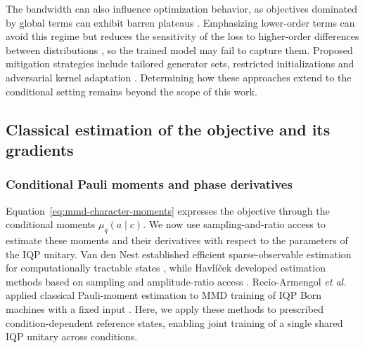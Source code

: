 \documentclass[pra,aps,10pt,twocolumn,floatfix,superscriptaddress, notitlepage,longbibliography]{revtex4-2}
\begin{document}
The bandwidth can also influence optimization behavior, as objectives dominated by global terms can exhibit barren plateaus \cite{mccleanBarrenPlateausQuantum2018,laroccaBarrenPlateausVariational2025,cerezoCostFunctionDependent2021}. Emphasizing lower-order terms can avoid this regime but reduces the sensitivity of the loss to higher-order differences between distributions \cite{rudolphTrainabilityBarriersOpportunities2024}, so the trained model may fail to capture them. Proposed mitigation strategies include tailored generator sets, restricted initializations and adversarial kernel adaptation \cite{shenCharacterizingTrainability2026,lerchIQPInitialization2026,kurkinUniversalityKernelAdaptive2025}. Determining how these approaches extend to the conditional setting remains beyond the scope of this work.

\subsection{Classical estimation of the objective and its gradients}
\label{sec:estimation}

\subsubsection{Conditional Pauli moments and phase derivatives}
\label{sec:ratio-estimator}

Equation~\eqref{eq:mmd-character-moments} expresses the objective through the conditional moments $\mu_q(a\mid c)$. We now use sampling-and-ratio access to estimate these moments and their derivatives with respect to the parameters of the IQP unitary. Van den Nest established efficient sparse-observable estimation for computationally tractable states \cite{nestSimulatingQuantumComputers2011}, while Havl\'{i}\v{c}ek developed estimation methods based on sampling and amplitude-ratio access \cite{havlicekAmplitudeRatiosNeural2023}. Recio-Armengol \textit{et al.} applied classical Pauli-moment estimation to MMD training of IQP Born machines with a fixed input \cite{recio-armengolTrainClassicalDeploy2026}. Here, we apply these methods to prescribed condition-dependent reference states, enabling joint training of a single shared IQP unitary across conditions.
\end{document}

